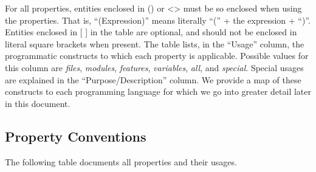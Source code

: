 \documentclass[10pt,letter]{article}
\begin{document}
For all properties, entities enclosed in () or <> must be so enclosed when using the properties. That is, ``(Expression)'' means literally ``('' + the expression + ``)''. Entities enclosed in [ ] in the table are optional, and should not be enclosed in literal square brackets when present.
The table lists, in the ``Usage'' column, the programmatic constructs to which each property is applicable. Possible values for this column are \textit{files}, \textit{modules}, \textit{features}, \textit{variables}, \textit{all}, and \textit{special}. Special usages are explained in the ``Purpose/Description'' column. We provide a map of these constructs to each programming language for which we go into greater detail later in this document.

\subsection{Property Conventions}

The following table documents all properties and their usages.
\end{document}
